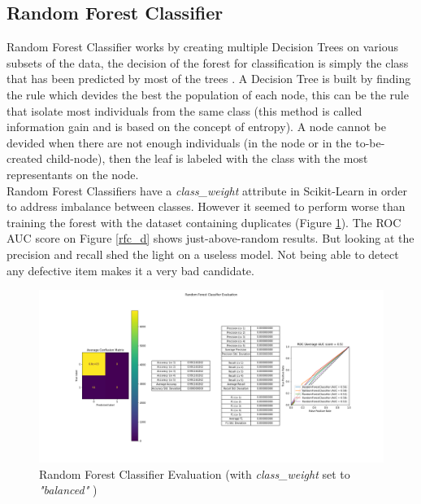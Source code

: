 \subsection{Random Forest Classifier}
Random Forest Classifier works by creating multiple Decision Trees on various
subsets of the data, the decision of the forest for classification is simply
the class that has been predicted by most of the trees \cite{rfc_wikipedia}. A
Decision Tree is built by finding the rule which devides the best the
population of each node, this can be the rule that isolate most individuals
from the same class (this method is called information gain and is based on the
concept of entropy)\cite{dtl_wikipedia}. A node cannot be devided when there
are not enough individuals (in the node or in the to-be-created child-node),
then the leaf is labeled with the class with the most representants on the
node.\\

Random Forest Classifiers have a \textit{class\_weight} attribute in
Scikit-Learn in order to address imbalance between classes\cite{rfc_scikit}.
However it seemed to perform worse than training the forest with the dataset
containing duplicates (Figure \ref{rfc_w}). The ROC AUC score on Figure \ref{rfc_d} shows
just-above-random results. But looking at the precision and recall shed the light on a useless model. Not being able to detect any defective item makes it a very bad candidate.\\

\begin{figure}
    \center
    \includegraphics[scale=0.32]{img/rfc_w.png}
    \caption{Random Forest Classifier Evaluation (with \textit{class\_weight}
        set to \textit{"balanced"} )}
    \label{rfc_w}
\end{figure}

